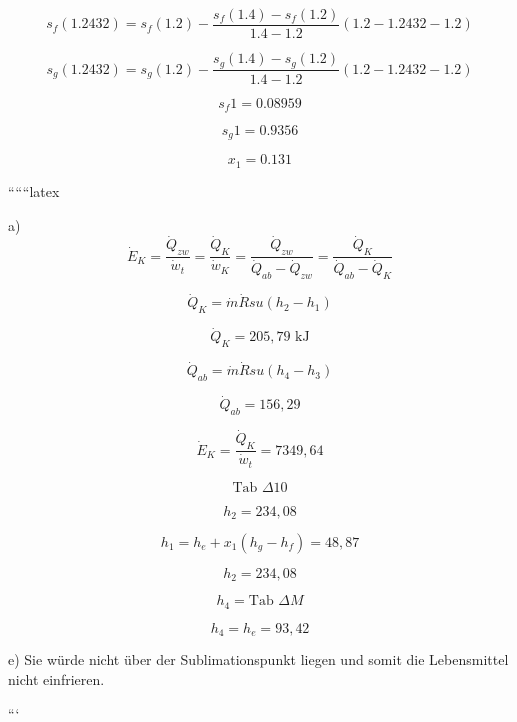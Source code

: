 \[
s_f (1.2432) = s_f (1.2) - \frac{s_f (1.4) - s_f (1.2)}{1.4 - 1.2} (1.2 - 1.2432 - 1.2)
\]

\[
s_g (1.2432) = s_g (1.2) - \frac{s_g (1.4) - s_g (1.2)}{1.4 - 1.2} (1.2 - 1.2432 - 1.2)
\]

\[
s_f 1 = 0.08959
\]

\[
s_g 1 = 0.9356
\]

\[
x_1 = 0.131
\]

``````latex


a) 
\[
\dot{E}_K = \frac{\dot{Q}_{zw}}{\dot{w}_t} = \frac{\dot{Q}_K}{\dot{w}_K} = \frac{\dot{Q}_{zw}}{\dot{Q}_{ab} - \dot{Q}_{zw}} = \frac{\dot{Q}_K}{\dot{Q}_{ab} - \dot{Q}_K}
\]

\[
\dot{Q}_K = \dot{m} \dot{R} s u (h_2 - h_1)
\]

\[
\dot{Q}_K = 205,79 \text{ kJ}
\]

\[
\dot{Q}_{ab} = \dot{m} \dot{R} s u (h_4 - h_3)
\]

\[
\dot{Q}_{ab} = 156,29
\]

\[
\dot{E}_K = \frac{\dot{Q}_K}{\dot{w}_t} = 7349,64
\]

\[
\text{Tab } \Delta 10
\]

\[
h_2 = 234,08
\]

\[
h_1 = h_e + x_1 (h_g - h_f) = 48,87
\]

\[
h_2 = 234,08
\]

\[
h_4 = \text{Tab } \Delta M
\]

\[
h_4 = h_e = 93,42
\]

e) Sie würde nicht über der Sublimationspunkt liegen und somit die Lebensmittel nicht einfrieren.

```